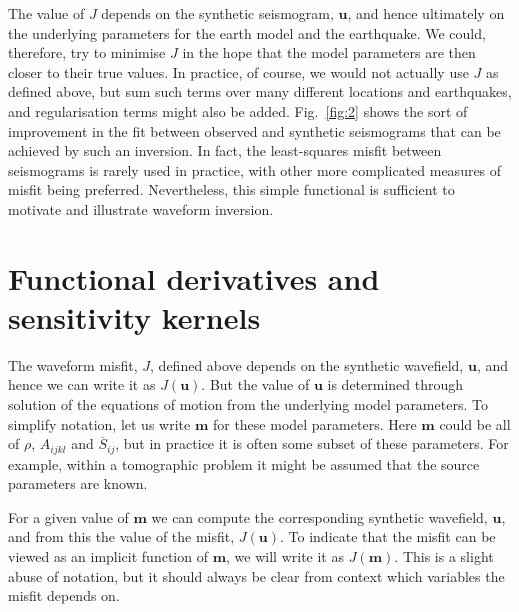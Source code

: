  The value of $J$ depends on the synthetic seismogram, $\mathbf{u}$, and hence ultimately on the underlying 
 parameters for the earth model and the earthquake. We could, therefore, try to minimise $J$ in the 
 hope that the model parameters are then closer to their true values. In practice, of course, we would 
 not actually use $J$ as defined above, but sum such terms over many different locations and earthquakes,
and regularisation terms might also be added. Fig.~\ref{fig:2} shows the sort of improvement in the fit between observed 
and synthetic seismograms that can be achieved by such an inversion. In fact, the least-squares misfit between seismograms is rarely 
used in practice, with other more complicated measures of misfit being preferred. Nevertheless, 
this simple functional is sufficient to motivate and illustrate waveform inversion.

\section*{Functional derivatives and sensitivity kernels}
The waveform misfit, $J$, defined above depends on the synthetic wavefield, $\mathbf{u}$, and hence we can write it
 as $J(\mathbf{u})$. But the value of $\mathbf{u}$ is determined through solution of the equations of motion from the 
 underlying model parameters. To simplify notation, let us write $\mathbf{m}$ for these model parameters. Here $\mathbf{m}$ could 
 be all of $\rho$, $A_{ijkl}$ and $\overline{S}_{ij}$, but in practice it is often some subset of these parameters. For example, 
 within a tomographic problem it might be assumed that the source parameters are known. 
 
 For a given value of $\mathbf{m}$ we can 
 compute the corresponding synthetic wavefield, $\mathbf{u}$, and from this the value of the misfit, $J(\mathbf{u})$. To indicate that 
 the misfit can be viewed as an implicit function of $\mathbf{m}$, we will write it as $J(\mathbf{m})$. This is a slight abuse of notation, 
 but it should always be clear from context which variables the misfit depends on.

